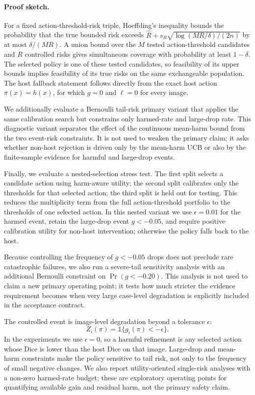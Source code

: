 \documentclass[preprint,12pt]{elsarticle}
\begin{document}
\paragraph{Proof sketch.}
For a fixed action-threshold-risk triple, Hoeffding's inequality bounds the
probability that the true bounded risk exceeds
$\widehat{R}+s_R\sqrt{\log(MR/\delta)/(2n)}$ by at most $\delta/(MR)$. A union
bound over the $M$ tested action-threshold candidates and $R$ controlled risks
gives simultaneous coverage with probability at least $1-\delta$. The selected
policy is one of these tested candidates, so feasibility of its upper bounds
implies feasibility of its true risks on the same exchangeable population. The
host fallback statement follows directly from the exact host action
$\pi(x)=h(x)$, for which $g=0$ and $\ell=0$ for every image.

We additionally evaluate a Bernoulli tail-risk primary variant that applies
the same calibration search but constrains only harmed-rate and large-drop
rate. This diagnostic variant separates the effect of the continuous mean-harm
bound from the two event-risk constraints. It is not used to weaken the primary
claim; it asks whether non-host rejection is driven only by the mean-harm UCB
or also by the finite-sample evidence for harmful and large-drop events.

Finally, we evaluate a nested-selection stress test. The first split selects a
candidate action using harm-aware utility; the second split calibrates only the
thresholds for that selected action; the third split is held out for testing.
This reduces the multiplicity term from the full action-threshold portfolio to
the thresholds of one selected action. In this nested variant we use
$\epsilon=0.01$ for the harmed event, retain the large-drop event
$g<-0.05$, and require positive calibration utility for non-host intervention;
otherwise the policy falls back to the host.

Because controlling the frequency of $g<-0.05$ drops does not preclude rare
catastrophic failures, we also run a severe-tail sensitivity analysis with an
additional Bernoulli constraint on $\Pr(g<-0.20)$. This analysis is not used to
claim a new primary operating point; it tests how much stricter the evidence
requirement becomes when very large case-level degradation is explicitly
included in the acceptance contract.

The controlled event is image-level degradation beyond a tolerance $\epsilon$:
\begin{equation}
    Z_i(\pi) = \mathbb{1}\{g_i(\pi) < -\epsilon\}.
\end{equation}
In the experiments we use $\epsilon=0$, so a harmful refinement is any selected
action whose Dice is lower than the host Dice on that image. Large-drop and
mean-harm constraints make the policy sensitive to tail risk, not only to the
frequency of small negative changes. We also report utility-oriented
single-risk analyses with a non-zero harmed-rate budget; these are exploratory
operating points for quantifying available gain and residual harm, not the
primary safety claim.
\end{document}
